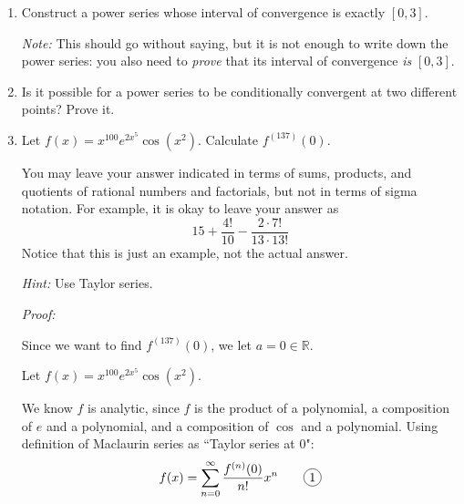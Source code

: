\documentclass[12pt]{exam}
\newcommand {\DS} [1] {${\displaystyle #1}$}
\newcommand{\R}{\mathbb{R}}
\newcommand*\circled[1]{\tikz[baseline=(char.base)]{
            \node[shape=circle,draw,inner sep=2pt] (char) {#1};}}
\begin{document}
\begin{enumerate}

\item Construct a power series whose interval of convergence is exactly \DS{[0,3]}. 

\emph{Note:}  This should go without saying, but it is not enough to write down the power series: you also need to \emph{prove} that its interval of convergence \emph{is} \DS{[0,3].}

\item Is it possible for a power series to be conditionally convergent at two different points?  Prove it.

\item Let \DS{f(x) = x^{100} e^{2x^5} \cos ( x^2) }.  Calculate \DS{f^{(137)}(0)}.   

You may leave your answer indicated in terms of sums, products, and quotients of rational numbers and factorials, but not in terms of sigma notation.  For example, it is okay to leave your answer as
	$$
		 15 + \frac{4!}{10} - \frac{2 \cdot 7!}{13 \cdot 13!}
	$$ 
Notice that this is just an example, not the actual answer.	

\emph{Hint:}  Use Taylor series.  

\emph{Proof:}

Since we want to find $f^{(137)}(0)$, we let $a=0\in\R$.

Let $f(x) = x^{100} e^{2x^5} \cos ( x^2)$.

We know $f$ is analytic, since $f$ is the product of a polynomial, a composition of $e$ and a polynomial, and a composition of $\cos$ and a polynomial. Using definition of Maclaurin series as ``Taylor series at $0$":
$$
    f(x)=\sum_{n=0}^\infty \frac{f^{(n)}(0)}{n!}x^n \qquad\circled{1}
$$


\end{enumerate}
\end{document}
